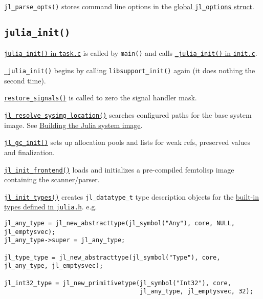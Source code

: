 \texttt{jl\_parse\_opts()} stores command line options in the \href{https://github.com/JuliaLang/julia/blob/master/src/julia.h}{global \texttt{jl\_options} struct}.



\hypertarget{10951200599627901176}{}


\subsection{\texttt{julia\_init()}}



\href{https://github.com/JuliaLang/julia/blob/master/src/task.c}{\texttt{julia\_init()} in \texttt{task.c}} is called by \texttt{main()} and calls \href{https://github.com/JuliaLang/julia/blob/master/src/init.c}{\texttt{\_julia\_init()} in \texttt{init.c}}.



\texttt{\_julia\_init()} begins by calling \texttt{libsupport\_init()} again (it does nothing the second time).



\href{https://github.com/JuliaLang/julia/blob/master/src/signals-unix.c}{\texttt{restore\_signals()}} is called to zero the signal handler mask.



\href{https://github.com/JuliaLang/julia/blob/master/src/init.c}{\texttt{jl\_resolve\_sysimg\_location()}} searches configured paths for the base system image. See \hyperlink{15513456349900674098}{Building the Julia system image}.



\href{https://github.com/JuliaLang/julia/blob/master/src/gc.c}{\texttt{jl\_gc\_init()}} sets up allocation pools and lists for weak refs, preserved values and finalization.



\href{https://github.com/JuliaLang/julia/blob/master/src/ast.c}{\texttt{jl\_init\_frontend()}} loads and initializes a pre-compiled femtolisp image containing the scanner/parser.



\href{https://github.com/JuliaLang/julia/blob/master/src/jltypes.c}{\texttt{jl\_init\_types()}} creates \texttt{jl\_datatype\_t} type description objects for the \href{https://github.com/JuliaLang/julia/blob/master/src/julia.h}{built-in types defined in \texttt{julia.h}}. e.g.




\begin{lstlisting}
jl_any_type = jl_new_abstracttype(jl_symbol("Any"), core, NULL, jl_emptysvec);
jl_any_type->super = jl_any_type;

jl_type_type = jl_new_abstracttype(jl_symbol("Type"), core, jl_any_type, jl_emptysvec);

jl_int32_type = jl_new_primitivetype(jl_symbol("Int32"), core,
                                     jl_any_type, jl_emptysvec, 32);
\end{lstlisting}



